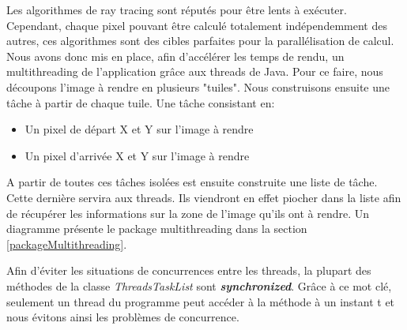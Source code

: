 \documentclass[../../Rapport RayTracer.tex]{subfiles}
\begin{document}
\label{multithreading}
Les algorithmes de ray tracing sont réputés pour être lents à exécuter. Cependant, chaque pixel pouvant être calculé totalement indépendemment des autres,
ces algorithmes sont des cibles parfaites pour la parallélisation de calcul. Nous avons donc mis en place, afin d'accélérer les temps de rendu, un multithreading de
l'application grâce aux threads de Java. Pour ce faire, nous découpons l'image à rendre en plusieurs "tuiles". Nous construisons ensuite une tâche à partir de chaque tuile.
Une tâche consistant en:
\begin{itemize}
	\item{Un pixel de départ X et Y sur l'image à rendre}	
	\item{Un pixel d'arrivée X et Y sur l'image à rendre}
\end{itemize}
A partir de toutes ces tâches isolées est ensuite construite une liste de tâche. Cette dernière servira aux threads. Ils viendront en effet piocher dans la liste afin de récupérer les informations sur la zone de l'image qu'ils ont à rendre.
Un diagramme présente le package multithreading dans la section \ref{packageMultithreading}.

Afin d'éviter les situations de concurrences entre les threads, la plupart des méthodes de la classe \textit{ThreadsTaskList} sont \textit{\textbf{synchronized}}. Grâce à ce mot clé, seulement un thread du programme peut accéder à la méthode à un instant t et nous évitons ainsi les problèmes de concurrence.
\end{document}
